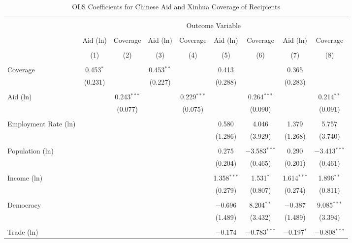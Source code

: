 
\begin{sidewaystable}[!htbp] \centering 
  \caption{OLS Coefficients for Chinese Aid and Xinhua Coverage of Recipients} 
  \label{} 
\begin{tabular}{@{\extracolsep{0pt}}lcccccccc} 
\\[-1.8ex]\hline 
\hline \\[-1.8ex] 
 & \multicolumn{8}{c}{Outcome Variable} \\ 
\cline{2-9} 
\\[-1.8ex] & Aid (ln) & Coverage & Aid (ln) & Coverage & Aid (ln) & Coverage & Aid (ln) & Coverage \\ 
\\[-1.8ex] & (1) & (2) & (3) & (4) & (5) & (6) & (7) & (8)\\ 
\hline \\[-1.8ex] 
 Coverage & 0.453$^{*}$ &  & 0.453$^{**}$ &  & 0.413 &  & 0.365 &  \\ 
  & (0.231) &  & (0.227) &  & (0.288) &  & (0.283) &  \\ 
  & & & & & & & & \\ 
 Aid (ln) &  & 0.243$^{***}$ &  & 0.229$^{***}$ &  & 0.264$^{***}$ &  & 0.214$^{**}$ \\ 
  &  & (0.077) &  & (0.075) &  & (0.090) &  & (0.091) \\ 
  & & & & & & & & \\ 
 Employment Rate (ln) &  &  &  &  & 0.580 & 4.046 & 1.379 & 5.757 \\ 
  &  &  &  &  & (1.286) & (3.929) & (1.268) & (3.740) \\ 
  & & & & & & & & \\ 
 Population (ln) &  &  &  &  & 0.275 & $-$3.583$^{***}$ & 0.290 & $-$3.413$^{***}$ \\ 
  &  &  &  &  & (0.204) & (0.465) & (0.201) & (0.461) \\ 
  & & & & & & & & \\ 
 Income (ln) &  &  &  &  & 1.358$^{***}$ & 1.531$^{*}$ & 1.614$^{***}$ & 1.896$^{**}$ \\ 
  &  &  &  &  & (0.279) & (0.807) & (0.274) & (0.811) \\ 
  & & & & & & & & \\ 
 Democracy &  &  &  &  & $-$0.696 & 8.204$^{**}$ & $-$0.387 & 9.085$^{***}$ \\ 
  &  &  &  &  & (1.489) & (3.432) & (1.489) & (3.394) \\ 
  & & & & & & & & \\ 
 Trade (ln) &  &  &  &  & $-$0.174 & $-$0.783$^{***}$ & $-$0.197$^{*}$ & $-$0.808$^{***}$ \\ 

\end{tabular}
\end{sidewaystable}
